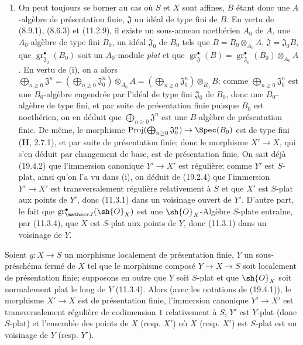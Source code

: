 \begin{enumerate}
  \item[(ii)] On peut toujours se borner au cas où $S$ et $X$ sont affines, $B$ étant donc une $A$-algèbre de présentation finie, $\mathfrak J$ un idéal de type fini de $B$. En vertu de (8.9.1), (8.6.3) et (11.2.9), il existe un sous-anneau noethérien $A_0$ de $A$, une $A_0$-algèbre de type fini $B_0$, un idéal $\mathfrak J_0$ de $B_0$ tels que $B=B_0\otimes_{A_0}A$, $\mathfrak J=\mathfrak J_0B$, que $\operatorname{gr}_{\mathfrak J_0}^\bullet(B_0)$ soit un $A_0$-module \emph{plat} et que $\operatorname{gr}_{\mathfrak J}^\bullet(B)=\operatorname{gr}_{\mathfrak J_0}^\bullet(B_0)\otimes_{A_0}A$. En vertu de (i), on a alors $\bigoplus_{n\geq0}\mathfrak J^n=(\bigoplus_{n\geq0}\mathfrak J_0^n)\otimes_{A_0}A=(\bigoplus_{n\geq0}\mathfrak J_0^n)\otimes_{B_0}B$; comme $\bigoplus_{n\geq0}\mathfrak J_0^n$ est une $B_0$-algèbre engendrée par l'idéal de type fini $\mathfrak J_0$ de $B_0$, donc une $B_0$-algèbre de type fini, et par suite de présentation finie puisque $B_0$ est noethérien, on en déduit que $\bigoplus_{n\geq0}\mathfrak J^n$ est une $B$-algèbre de présentation finie. De même, le morphisme $\operatorname{Proj}(\bigoplus_{n\geq0}\mathfrak J_0^n)\to\Spec(B_0)$ est de type fini (\textbf{II}, 2.7.1), et par suite de présentation finie; donc le morphisme $X'\to X$, qui s'en déduit par changement de base, est de présentation finie. On sait déjà (19.4.2) que l'immersion canonique $Y'\to X'$ est régulière; comme $Y'$ est $S$-plat, ainsi qu'on l'a vu dans (i), on déduit de (19.2.4) que l'immersion $Y'\to X'$ est transversalement régulière relativement à $S$ et que $X'$ est $S$-plat aux points de $Y'$, donc (11.3.1) dans un voisinage ouvert de $Y'$. D'autre part, le fait que $\operatorname{gr}_{\mathscr J}^\bullet(\sh{O}_X)$ est une $\sh{O}_X$-Algèbre $S$-plate entraîne, par (11.3.4), que $X$ est $S$-plat aux points de $Y$, donc (11.3.1) dans un voisinage de $Y$.
\end{enumerate}

\begin{corollary}[19.4.7]
\label{IV.19.4.7}
Soient $g:X\to S$ un morphisme localement de présentation finie, $Y$ un sous-préschéma fermé de $X$ tel que le morphisme composé $Y\to X\to S$ soit localement de présentation finie; supposons en outre que $Y$ soit $S$-plat et que $\sh{O}_X$ soit normalement plat le long de $Y$ \textup{(11.3.4)}. Alors \textup{(avec les notations de (19.4.1))}, le morphisme $X'\to X$ est de présentation finie, l'immersion canonique $Y'\to X'$ est transversalement régulière de codimension $1$ relativement à $S$, $Y'$ est $Y$-plat (donc $S$-plat) et l'ensemble des points de $X$ \textup{(resp. $X'$)} où $X$ \textup{(resp. $X'$)} est $S$-plat est un voisinage de $Y$ \textup{(resp. $Y'$)}.
\end{corollary}

